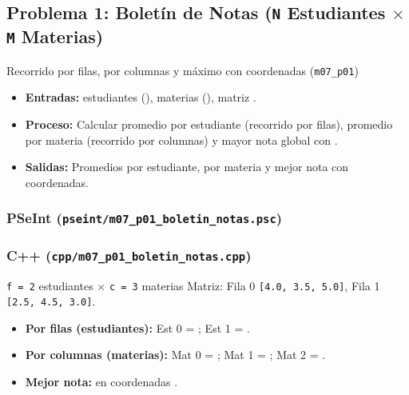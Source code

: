 \documentclass[11pt,letterpaper]{article}
\begin{document}
\subsection{Problema 1: Boletín de Notas (\texttt{N} Estudiantes \texorpdfstring{$\times$}{x} \texttt{M} Materias)}
\begin{analisis}{Recorrido por filas, por columnas y máximo con coordenadas (\texttt{m07\_p01})}
\begin{itemize}
  \item \textbf{Entradas:}  estudiantes (),  materias (), matriz .
  \item \textbf{Proceso:} Calcular promedio por estudiante (recorrido por filas), promedio por materia (recorrido por columnas) y mayor nota global con .
  \item \textbf{Salidas:} Promedios por estudiante, por materia y mejor nota con coordenadas.
\end{itemize}
\end{analisis}

\subsubsection*{PSeInt (\texttt{pseint/m07\_p01\_boletin\_notas.psc})}


\subsubsection*{C++ (\texttt{cpp/m07\_p01\_boletin\_notas.cpp})}


\begin{pruebaescritorio}{\texttt{f = 2} estudiantes $\times$ \texttt{c = 3} materias}
Matriz: Fila 0 \texttt{[4.0, 3.5, 5.0]}, Fila 1 \texttt{[2.5, 4.5, 3.0]}.
\begin{itemize}
  \item \textbf{Por filas (estudiantes):} Est 0 = ; Est 1 = .
  \item \textbf{Por columnas (materias):} Mat 0 = ; Mat 1 = ; Mat 2 = .
  \item \textbf{Mejor nota:}  en coordenadas .
\end{itemize}
\end{pruebaescritorio}
\end{document}
